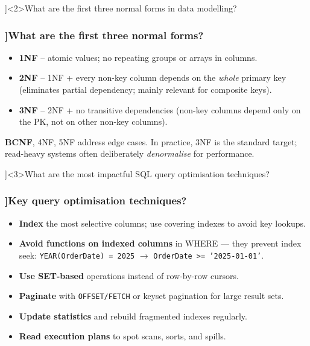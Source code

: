 \QuestionSlide[\CategoryBadge[DbColor!20]{Databases}]<2>{What are the first three normal forms in data modelling?}

\begin{frame}[fragile]
  \frametitle{\AnswerTitle[\CategoryBadge[DbColor!20]{Databases}]{What are the first three normal forms?}}

  {\footnotesize
  \begin{itemize}
    \item \textbf{1NF} – atomic values; no repeating groups or arrays in columns.
    \item \textbf{2NF} – 1NF + every non-key column depends on the \emph{whole} primary key (eliminates partial dependency; mainly relevant for composite keys).
    \item \textbf{3NF} – 2NF + no transitive dependencies (non-key columns depend only on the PK, not on other non-key columns).
  \end{itemize}
  \textbf{BCNF}, 4NF, 5NF address edge cases. In practice, 3NF is the standard target; read-heavy systems often deliberately \emph{denormalise} for performance.
  }
\end{frame}

\QuestionSlide[\CategoryBadge[DbColor!20]{Databases}]<3>{What are the most impactful SQL query optimisation techniques?}

\begin{frame}[fragile]
  \frametitle{\AnswerTitle[\CategoryBadge[DbColor!20]{Databases}]{Key query optimisation techniques?}}

  {\footnotesize
  \begin{itemize}
    \item \textbf{Index} the most selective columns; use covering indexes to avoid key lookups.
    \item \textbf{Avoid functions on indexed columns} in WHERE — they prevent index seek: \texttt{YEAR(OrderDate) = 2025} $\to$ \texttt{OrderDate >= '2025-01-01'}.
    \item \textbf{Use SET-based} operations instead of row-by-row cursors.
    \item \textbf{Paginate} with \texttt{OFFSET/FETCH} or keyset pagination for large result sets.
    \item \textbf{Update statistics} and rebuild fragmented indexes regularly.
    \item \textbf{Read execution plans} to spot scans, sorts, and spills.
  \end{itemize}
  }
\end{frame}
